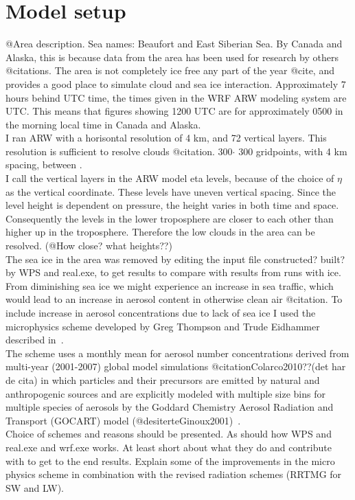 \section{Model setup}
\label{sec:modelsetup}
@Area description. Sea names: Beaufort and East Siberian Sea. By Canada and Alaska, this is because data from the area has been used for research by others @citations. The area is not completely ice free any part of the year @cite, and provides a good place to simulate cloud and sea ice interaction. Approximately 7 hours behind UTC time, the times given in the WRF ARW modeling system are UTC. This means that figures showing 1200 UTC are for approximately 0500 in the morning local time in Canada and Alaska.
\\
I ran ARW with a horisontal resolution of 4 km, and 72 vertical layers. This resolution is sufficient to resolve clouds @citation. 300$\cdot$ 300 gridpoints, with 4 km spacing, between .
\\
I call the vertical layers in the ARW model eta levels, because of the choice of $\eta$ as the vertical coordinate. These levels have uneven vertical spacing. Since the level height is dependent on pressure, the height varies in both time and space. Consequently the levels in the lower troposphere are closer to each other than higher up in the troposphere. Therefore the low clouds in the area can be resolved. (@How close? what heights??)
\\
The sea ice in the area was removed by editing the input file constructed? built? by WPS and real.exe, to get results to compare with results from runs with ice.
\\
From diminishing sea ice we might experience an increase in sea traffic, which would lead to an increase in aerosol content in otherwise clean air @citation. To include increase in aerosol concentrations due to lack of sea ice I used the microphysics scheme developed by Greg Thompson and Trude Eidhammer described in~\citet{Thompson2014}.
\\
The scheme uses a monthly mean for aerosol number concentrations derived from multi-year (2001-2007) global model simulations @citationColarco2010??(det har de cita) in which particles and their precursors are emitted by natural and anthropogenic sources and are explicitly modeled with multiple size bins for multiple species of aerosols by the Goddard Chemistry Aerosol Radiation and Transport (GOCART) model (@desiterteGinoux2001)~\citep{Thompson2014}.
\\
Choice of schemes and reasons should be presented. As should how WPS and real.exe and wrf.exe works. At least short about what they do and contribute with to get to the end results. Explain some of the improvements in the micro physics scheme in combination with the revised radiation schemes (RRTMG for SW and LW).

